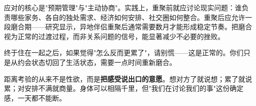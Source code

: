 应对的核心是"预期管理"与"主动协商"。实践上，重聚前就应讨论现实问题：谁负责哪些家务、各自的独处需求、经济如何安排、社交圈如何整合。重聚后应允许一段磨合期——研究显示，异地伴侣重聚后通常需要数月才能形成稳定节奏。把磨合视为正常的过渡过程，而非关系问题的信号，能显著减少不必要的挫败。

\begin{tcolorbox}[colback=pink!5!white,colframe=red!50!black,title=贴心小叮咛]
终于住在一起之后，如果觉得"怎么反而更累了"，请别慌——这是正常的。你们只是从约会状态切回了生活状态，需要一点时间重新磨合。
\end{tcolorbox}

\begin{tcolorbox}[colback=blue!5!white,colframe=blue!50!black,title=贴心小叮咛]
距离考验的从来不是性欲，而是\textbf{把感受说出口的意愿}。想对方了就说想；累了就说累；对安排不满就商量。身体可以相隔千里，但"我们在讨论我们的事"这份确定感，一天都不能断。
\end{tcolorbox}
